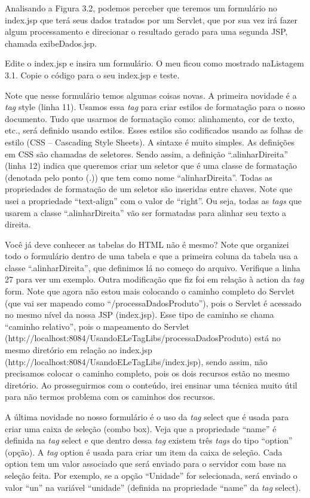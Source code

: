Analisando a Figura 3.2, podemos perceber que teremos um formulário no index.jsp que terá seus dados tratados por um Servlet, que por sua vez irá fazer algum processamento e direcionar o resultado gerado para uma segunda JSP, chamada exibeDados.jsp.

Edite o index.jsp e insira um formulário. O meu ficou como mostrado naListagem 3.1. Copie o código para o seu index.jsp e teste. 

Note que nesse formulário temos algumas coisas novas. A primeira novidade é a \textit{tag} style (linha 11). Usamos essa \textit{tag} para criar estilos de formatação para o nosso documento. Tudo que usarmos de formatação como: alinhamento, cor de texto, etc., será definido usando estilos. Esses estilos são codificados usando as folhas de estilo (CSS – Cascading Style Sheets). A sintaxe é muito simples. As definições em CSS são chamadas de seletores. Sendo assim, a definição ``.alinharDireita'' (linha 12) indica que queremos criar um seletor que é uma classe de formatação (denotada pelo ponto (.)) que tem como nome ``alinharDireita''. Todas as propriedades de formatação de um seletor são inseridas entre chaves. Note que usei a propriedade ``text-align'' com o valor de ``right''. Ou seja, todas as \textit{tags} que usarem a classe ``.alinharDireita'' vão ser formatadas para alinhar seu texto a direita.

Você já deve conhecer as tabelas do HTML não é mesmo? Note que organizei todo o formulário dentro de uma tabela e que a primeira coluna da tabela usa a classe ``.alinharDireita'', que definimos lá no começo do arquivo. Verifique a linha 27 para ver um exemplo. Outra modificação que fiz foi em relação à action da \textit{tag} form. Note que agora não estou mais colocando o caminho completo do Servlet (que vai ser mapeado como ``/processaDadosProduto''), pois o Servlet é acessado no mesmo nível da nossa JSP (index.jsp). Esse tipo de caminho se chama ``caminho relativo'', pois o mapeamento do Servlet (http://localhost:8084/UsandoELeTagLibs/processaDadosProduto) está no mesmo diretório em relação ao index.jsp (http://localhost:8084/UsandoELeTagLibs/index.jsp), sendo assim, não precisamos colocar o caminho completo, pois os dois recursos estão no mesmo diretório. Ao prosseguirmos com o conteúdo, irei ensinar uma técnica muito útil para não termos problema com os caminhos dos recursos.

A última novidade no nosso formulário é o uso da \textit{tag} select que é usada para criar uma caixa de seleção (combo box). Veja que a propriedade ``name'' é definida na \textit{tag} select e que dentro dessa \textit{tag} existem três \textit{tags} do tipo ``option'' (opção). A \textit{tag} option é usada para criar um item da caixa de seleção. Cada option tem um valor associado que será enviado para o servidor com base na seleção feita. Por exemplo, se a opção ``Unidade'' for selecionada, será enviado o valor ``un'' na variável ``unidade'' (definida na propriedade ``name'' da \textit{tag} select).

